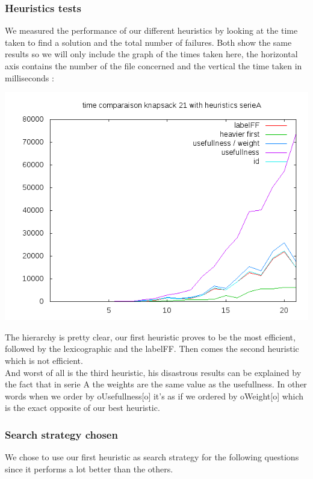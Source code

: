 \documentclass{eplDoc}
\begin{document}
\subsubsection{Heuristics tests} %

We measured the performance of our different heuristics by looking at the time taken to find a solution and the total number of failures. Both show the same results so we will only include the graph of the times taken here, the horizontal axis contains the number of the file concerned and the vertical the time taken in milliseconds : 

\begin{center}
\includegraphics[width=\columnwidth]{q321timeA.png}%
\end{center}

The hierarchy is pretty clear, our first heuristic proves to be the most efficient, followed by the lexicographic and the labelFF. Then comes the second heuristic which is not efficient. \\ 
And worst of all is the third heuristic, his disastrous results can be explained by the fact that in serie A the weights are the same value as the usefullness. In other words when we order by oUsefullness[o] it's as if we ordered by oWeight[o] which is the exact opposite of our best heuristic. 

\subsubsection{Search strategy chosen}
We chose to use our first heuristic as search strategy for the following questions since it performs a lot better than the others. 
\end{document}
